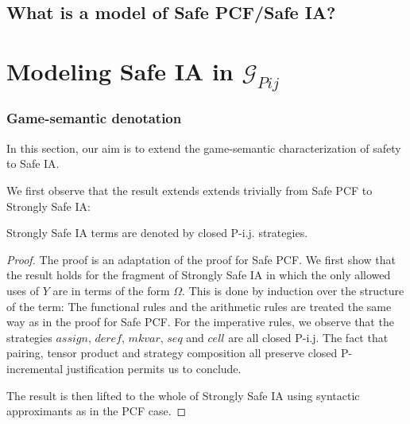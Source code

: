 \subsection{What is a model of Safe PCF/Safe IA?}




\section{Modeling Safe IA in $\mathcal{G}_{Pij}$}

\subsubsection{Game-semantic denotation}

In this section, our aim is to extend the game-semantic characterization of safety to Safe IA.

We first observe that the result extends extends trivially from Safe PCF to Strongly Safe IA:
\begin{proposition}
  Strongly Safe IA terms are denoted by closed P-i.j. strategies.
\end{proposition}
\begin{proof}
The proof is an adaptation of the proof for Safe PCF. We first show that the result holds for the
fragment of Strongly Safe IA in which the only allowed uses of $Y$ are in terms of the form $\Omega$.
This is done by induction over the structure of the term:
The functional rules and the arithmetic rules are treated
the same way as in the proof for Safe PCF. For the imperative rules, we
observe that the strategies $assign$, $deref$, $mkvar$, $seq$ and
$cell$ are all closed P-i.j. The fact that pairing, tensor product
and strategy composition all preserve closed P-incremental
justification permits us to conclude.

The result is then lifted to the whole of Strongly Safe IA using syntactic approximants as in the PCF case.
\end{proof}

